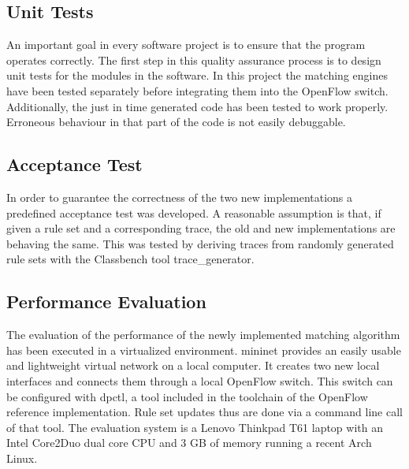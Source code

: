 \documentclass[a4paper,
		12pt,
		parskip=full,
		titlepage
		]{scrartcl}
\begin{document}
\subsection{Unit Tests}
An important goal in every software project is to ensure that the program operates correctly.
The first step in this quality assurance process is to design unit tests for the modules in the software.
In this project the matching engines have been tested separately before integrating them into the OpenFlow switch.
Additionally, the just in time generated code has been tested to work properly.
Erroneous behaviour in that part of the code is not easily debuggable.

\subsection{Acceptance Test}
In order to guarantee the correctness of the two new implementations a predefined acceptance test was developed.
A reasonable assumption is that, if given a rule set and a corresponding trace, the old and new implementations are behaving the same.
This was tested by deriving traces from randomly generated rule sets with the Classbench\cite{classbench_website} tool \textsf{trace\_generator}.

\subsection{Performance Evaluation}
The evaluation of the performance of the newly implemented matching algorithm has been executed in a virtualized environment.
\textsf{mininet}\cite{mininet} provides an easily usable and lightweight virtual network on a local computer.
It creates two new local interfaces and connects them through a local OpenFlow switch.
This switch can be configured with \textsf{dpctl}, a tool included in the toolchain of the OpenFlow reference implementation.
Rule set updates thus are done via a command line call of that tool.
The evaluation system is a Lenovo Thinkpad T61 laptop with an Intel Core2Duo dual core CPU and 3 GB of memory running a recent Arch Linux. %
\end{document}

